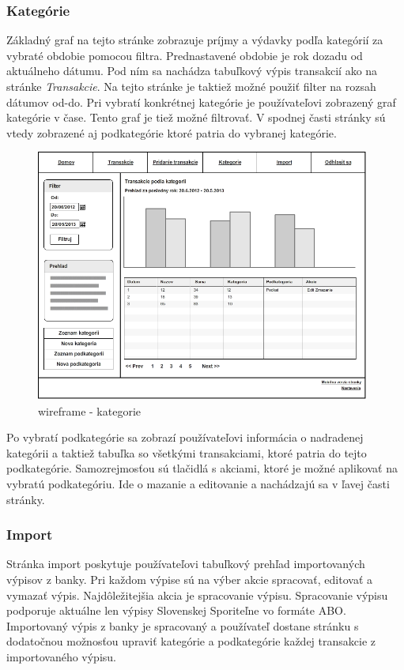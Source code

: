 \documentclass[12pt,oneside]{book}
\begin{document}
\subsubsection{Kategórie}
Základný graf na tejto stránke zobrazuje príjmy a výdavky podľa kategórií za vybraté obdobie pomocou filtra. Prednastavené obdobie je rok dozadu od aktuálneho dátumu. Pod ním sa nachádza tabuľkový výpis transakcií ako na stránke \emph{Transakcie}. Na tejto stránke je taktiež možné použiť filter na rozsah dátumov od-do. Pri vybratí konkrétnej kategórie je používateľovi zobrazený graf kategórie v čase. Tento graf je tiež možné filtrovať. V spodnej časti stránky sú vtedy zobrazené aj podkategórie ktoré patria do vybranej kategórie.
\begin{figure}[ht]
  \centering
      \includegraphics[width=11cm]{wireframe_kategorie}
  \caption{wireframe - kategorie}
  \label{wireframe - kategorie}
\end{figure} 

Po vybratí podkategórie sa zobrazí používateľovi informácia o nadradenej kategórii a taktiež tabuľka so všetkými transakciami, ktoré patria do tejto podkategórie. Samozrejmosťou sú tlačidlá s akciami, ktoré je možné aplikovať na vybratú podkategóriu. Ide o mazanie a editovanie a nachádzajú sa v ľavej časti stránky. 



\subsubsection{Import}
Stránka import poskytuje používateľovi tabuľkový prehľad importovaných výpisov z banky. Pri každom výpise sú na výber akcie spracovať, editovať a vymazať výpis. Najdôležitejšia akcia je spracovanie výpisu. Spracovanie výpisu podporuje aktuálne len výpisy Slovenskej Sporiteľne vo formáte ABO. Importovaný výpis z banky je spracovaný a používateľ dostane stránku s dodatočnou možnosťou upraviť kategórie a podkategórie každej transakcie z importovaného výpisu.
\end{document}
